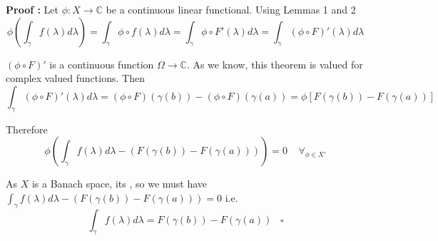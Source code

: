 \documentclass[12pt]{article}
\begin{document}
{\bf Proof :} Let $\phi : X \longrightarrow \mathbb{C}$ be a continuous linear functional. Using Lemmas 1 and 2
\begin{displaymath}
\phi \left(\int_{\gamma} f(\lambda) d\lambda \right) = \int_{\gamma} \phi \circ f(\lambda) d\lambda = \int_{\gamma} \phi \circ F'(\lambda) d\lambda = \int_{\gamma} (\phi \circ F)'(\lambda) d\lambda 
\end{displaymath}

$(\phi \circ F)'$ is a continuous function $\Omega \longrightarrow \mathbb{C}$. As we know, this theorem is valued for complex valued functions. Then
\begin{displaymath}
\int_{\gamma} (\phi \circ F)'(\lambda) d\lambda = (\phi \circ F)(\gamma (b)) - (\phi \circ F)(\gamma (a)) = \phi [F(\gamma (b)) -F(\gamma (a))]
\end{displaymath}

Therefore
\begin{displaymath}
\phi \left(\int_{\gamma} f(\lambda) d\lambda - (F(\gamma (b)) -F(\gamma (a))) \right) = 0 \;\;\;\; \forall_{\phi \in X'}
\end{displaymath}

As $X$ is a Banach space, its , so we must have $\int_{\gamma} f(\lambda) d\lambda - (F(\gamma (b)) -F(\gamma (a))) =0$ i.e.
\begin{displaymath}
\int_{\gamma} f(\lambda) d\lambda = F(\gamma (b)) -F(\gamma (a)) \;\;\;\square
\end{displaymath}
\end{document}
